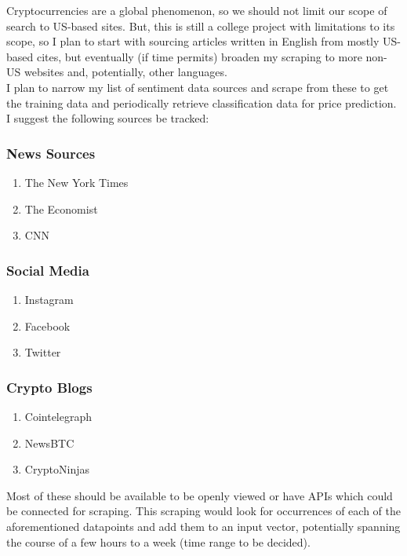\documentclass{article}
\begin{document}
Cryptocurrencies are a global phenomenon, so we should not limit our scope of search to US-based sites. But, this is still a college project with limitations to its scope, so I plan to start with sourcing articles written in English from mostly US-based cites, but eventually (if time permits) broaden my scraping to more non-US websites and, potentially, other languages. \\

I plan to narrow my list of sentiment data sources and scrape from these to get the training data and periodically retrieve classification data for price prediction. I suggest the following sources be tracked:

\subsubsection{News Sources}
\label{sec:newssources}

\begin{enumerate}
    \item The New York Times
    \item The Economist
    \item CNN
\end{enumerate}

\subsubsection{Social Media}

\begin{enumerate}
    \item Instagram
    \item Facebook
    \item Twitter
\end{enumerate}

\subsubsection{Crypto Blogs}

\begin{enumerate}
    \item Cointelegraph
    \item NewsBTC
    \item CryptoNinjas
\end{enumerate}

Most of these should be available to be openly viewed or have APIs which could be connected for scraping. This scraping would look for occurrences of each of the aforementioned datapoints and add them to an input vector, potentially spanning the course of a few hours to a week (time range to be decided).
\end{document}
